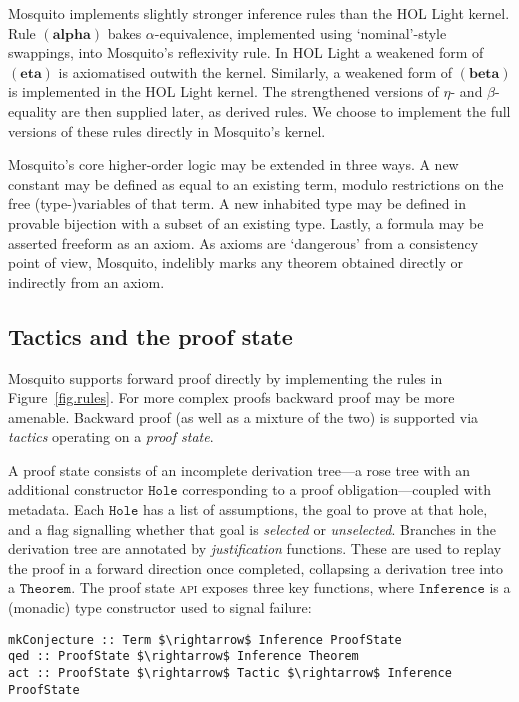 \documentclass{llncs}
\newcommand{\mosquito}{Mosquito\xspace}
\newcommand{\rulefont}[1]{\ensuremath{(\mathbf{#1})}}
\begin{document}
\mosquito implements slightly stronger inference rules than the HOL Light kernel.
Rule \rulefont{alpha} bakes $\alpha$-equivalence, implemented using `nominal'-style swappings, into \mosquito's reflexivity rule.
In HOL Light a weakened form of \rulefont{eta} is axiomatised outwith the kernel.
Similarly, a weakened form of \rulefont{beta} is implemented in the HOL Light kernel.
The strengthened versions of $\eta$- and $\beta$-equality are then supplied later, as derived rules.
We choose to implement the full versions of these rules directly in \mosquito's kernel.

\mosquito's core higher-order logic may be extended in three ways.
A new constant may be defined as equal to an existing term, modulo restrictions on the free (type-)variables of that term.
A new inhabited type may be defined in provable bijection with a subset of an existing type.
Lastly, a formula may be asserted freeform as an axiom.
As axioms are `dangerous' from a consistency point of view, \mosquito, indelibly marks any theorem obtained directly or indirectly from an axiom.

\subsection*{Tactics and the proof state}
\label{sect.tactics.proof.state}

\mosquito supports forward proof directly by implementing the rules in Figure~\ref{fig.rules}.
For more complex proofs backward proof may be more amenable.
Backward proof (as well as a mixture of the two) is supported via \emph{tactics} operating on a \emph{proof state}.

A proof state consists of an incomplete derivation tree---a rose tree with an additional constructor $\mathtt{Hole}$ corresponding to a proof obligation---coupled with metadata.
Each $\mathtt{Hole}$ has a list of assumptions, the goal to prove at that hole, and a flag signalling whether that goal is \emph{selected} or \emph{unselected}.
Branches in the derivation tree are annotated by \emph{justification} functions.
These are used to replay the proof in a forward direction once completed, collapsing a derivation tree into a $\mathtt{Theorem}$.
The proof state \textsc{api} exposes three key functions, where $\mathtt{Inference}$ is a (monadic) type constructor used to signal failure:
\begin{lstlisting}
mkConjecture :: Term $\rightarrow$ Inference ProofState
qed :: ProofState $\rightarrow$ Inference Theorem
act :: ProofState $\rightarrow$ Tactic $\rightarrow$ Inference ProofState
\end{lstlisting}
\end{document}
